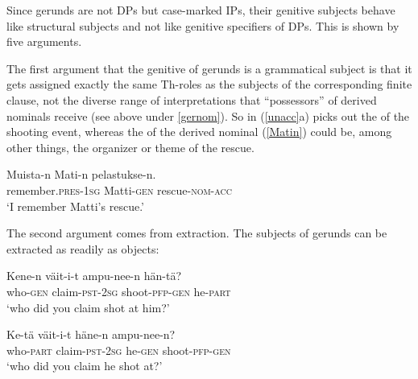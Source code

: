 \documentclass[output=paper,
modfonts
]{LSP/langsci}
\newcommand{\rf}[1]{(\ref{#1})}
\newcommand{\rfa}[2]{(\ref{#1}{#2})}
\begin{document}
Since gerunds are not DPs but case-marked IPs, their genitive subjects behave like structural
subjects and not like genitive specifiers of DPs.  This is shown by five arguments.

The first argument that the genitive  of gerunds is a grammatical subject is
that it gets assigned exactly the same Th-roles as the subjects of the corresponding finite
clause, not the diverse range of interpretations that ``possessors'' of derived nominals
receive (see above under \cref{gernom}).  So  in \rfa{unacc}{a} 
picks out the  of the shooting event, whereas the   of the derived
nominal \rf{Matin} could be, among other things, the organizer or theme of the rescue.
\begin{exe}
\ex\label{Matin}
  \gll Muista-n Mati-n pelastukse-n. \\
remember.\textsc{pres}-\textsc{1sg} Matti-\textsc{gen} rescue-\textsc{nom}-\textsc{acc}\\
		\glt `I remember Matti's rescue.' 
\end{exe}

The second argument comes from extraction.  The
subjects of gerunds can be extracted as readily as objects:
\begin{exe}
\ex\label{nolbc}
	\ea  \gll  Kene-n väit-i-t ampu-nee-n hän-tä?\\
		 who-\textsc{gen} claim-\textsc{pst}-\textsc{2sg} shoot-\textsc{pfp}-\textsc{gen} he-\textsc{part}\\
		\glt `who did you claim shot at him?' 
	
	\ex  \gll  Ke-tä väit-i-t häne-n       ampu-nee-n?\\
		who-\textsc{part} claim-\textsc{pst}-\textsc{2sg} he-\textsc{gen} shoot-\textsc{pfp}-\textsc{gen} \\
		\glt `who did you claim he shot at?' 
	\z
\end{exe}
\end{document}
